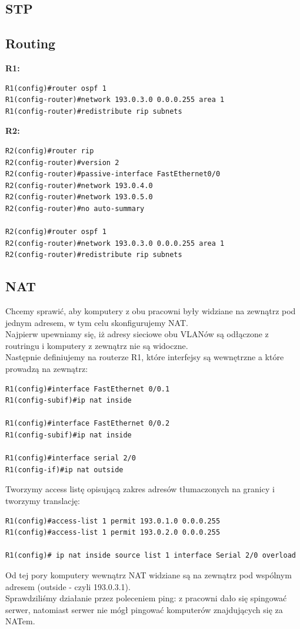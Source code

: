 \documentclass[11pt,a4paper]{article}
\begin{document}
\subsection{STP}

\subsection{Routing}
{\bf R1:}\\
\begin{lstlisting}
R1(config)#router ospf 1
R1(config-router)#network 193.0.3.0 0.0.0.255 area 1
R1(config-router)#redistribute rip subnets 
 \end{lstlisting}
{\bf R2:}\\
\begin{lstlisting}
R2(config)#router rip
R2(config-router)#version 2
R2(config-router)#passive-interface FastEthernet0/0
R2(config-router)#network 193.0.4.0
R2(config-router)#network 193.0.5.0
R2(config-router)#no auto-summary

R2(config)#router ospf 1
R2(config-router)#network 193.0.3.0 0.0.0.255 area 1
R2(config-router)#redistribute rip subnets 
 \end{lstlisting}
\subsection{NAT}

Chcemy sprawić, aby komputery z obu pracowni były widziane na zewnątrz pod jednym adresem, w tym celu skonfigurujemy NAT.\\
Najpierw upewniamy się, iż adresy sieciowe obu VLANów są odłączone z routringu i komputery z zewnątrz nie są widoczne.\\
Następnie definiujemy na routerze R1, które interfejsy są wewnętrzne a które prowadzą na zewnątrz:
\begin{lstlisting}
R1(config)#interface FastEthernet 0/0.1
R1(config-subif)#ip nat inside

R1(config)#interface FastEthernet 0/0.2
R1(config-subif)#ip nat inside

R1(config)#interface serial 2/0
R1(config-if)#ip nat outside
\end{lstlisting}

Tworzymy access listę opisującą zakres adresów tłumaczonych na granicy i tworzymy translację:
\begin{lstlisting}
R1(config)#access-list 1 permit 193.0.1.0 0.0.0.255
R1(config)#access-list 1 permit 193.0.2.0 0.0.0.255

R1(config)# ip nat inside source list 1 interface Serial 2/0 overload
\end{lstlisting}
Od tej pory komputery wewnątrz NAT widziane są na zewnątrz pod wspólnym adresem (outside - czyli 193.0.3.1).\\
Sprawdziliśmy działanie przez poleceniem ping: z pracowni dało się spingować serwer, natomiast serwer nie mógł pingować komputerów znajdujących się za NATem.
 
\end{document}
